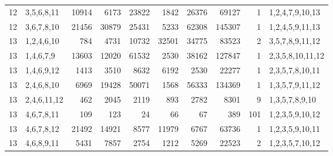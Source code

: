 \begin{table}[tp]
\begin{ruledtabular}
\begin{tabular}{rlrrrrrrrl}
12 & 3,5,6,8,11 & 10914 & 6173 & 23822 & 1842 & 26376 & 69127 & 1 & 1,2,4,7,9,10,13 \\
12 & 3,6,7,8,10 & 21456 & 30879 & 25431 & 5233 & 62308 & 145307 & 1 & 1,2,4,5,9,11,13 \\
13 & 1,2,4,6,10 & 784 & 4731 & 10732 & 32501 & 34775 & 83523 & 2 & 3,5,7,8,9,11,12 \\
13 & 1,4,6,7,9 & 13603 & 12020 & 61532 & 2530 & 38162 & 127847 & 1 & 2,3,5,8,10,11,12 \\
13 & 1,4,6,9,12 & 1413 & 3510 & 8632 & 6192 & 2530 & 22277 & 1 & 2,3,5,7,8,10,11 \\
13 & 2,4,6,8,10 & 6969 & 19428 & 50071 & 1568 & 56333 & 134369 & 1 & 1,3,5,7,9,11,12 \\
13 & 2,4,6,11,12 & 462 & 2045 & 2119 & 893 & 2782 & 8301 & 9 & 1,3,5,7,8,9,10 \\
13 & 4,6,7,8,11 & 109 & 123 & 24 & 66 & 67 & 389 & 101 & 1,2,3,5,9,10,12 \\
13 & 4,6,7,8,12 & 21492 & 14921 & 8577 & 11979 & 6767 & 63736 & 1 & 1,2,3,5,9,10,11 \\
13 & 4,6,8,9,11 & 5431 & 7857 & 2754 & 1212 & 5269 & 22523 & 2 & 1,2,3,5,7,10,12 \\
\end{tabular}
\end{ruledtabular}
\end{table}
